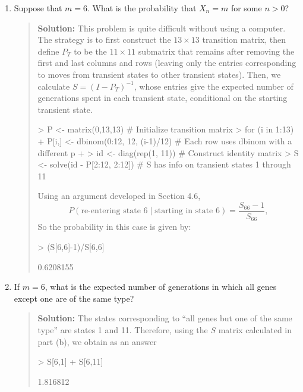 \documentclass{article}
\begin{document}
\begin{enumerate}
\begin{enumerate}
    \item Suppose that $m=6$. What is the probability that $X_n=m$ for some
    $n>0$?
    \begin{quotation}{\bf Solution:}
    This problem is quite difficult without using a computer.  The strategy is to first construct
    the $13\times 13$ transition matrix, then define $P_T$ to be the $11\times 11$ submatrix 
    that remains after removing the first and last columns and rows (leaving only the entries
    corresponding to moves from transient states to other transient states).  Then, we calculate
    $S=(I-P_T)^{-1}$, whose entries give the expected number of generations spent in each
    transient state, conditional on the starting transient state.
\begin{Schunk}
\begin{Sinput}
> P <- matrix(0,13,13) # Initialize transition matrix
> for (i in 1:13) {
+   P[i,] <- dbinom(0:12, 12, (i-1)/12) # Each row uses dbinom with a different p
+ }
> id <- diag(rep(1, 11)) # Construct identity matrix
> S <- solve(id - P[2:12, 2:12])    # S has info on transient states 1 through 11
\end{Sinput}
\end{Schunk}
    Using an argument developed in Section 4.6, 
    \[
    P(\mbox{re-entering state 6} \mid \mbox{starting in state 6}) = \frac{S_{66}-1}{S_{66}},
    \]
    So the probability in this case is given by:
\begin{Schunk}
\begin{Sinput}
> (S[6,6]-1)/S[6,6]
\end{Sinput}
\begin{Soutput}
[1] 0.6208155
\end{Soutput}
\end{Schunk}
    \end{quotation}

    \item If $m=6$, what is the expected number of generations in which all
    genes except one are of the same type?
    \begin{quotation}{\bf Solution:}
    The states corresponding to ``all genes but one of the same type'' are states 1 
    and 11.  Therefore, using the $S$ matrix calculated in part (b), we obtain 
    as an answer
\begin{Schunk}
\begin{Sinput}
> S[6,1] + S[6,11]
\end{Sinput}
\begin{Soutput}
[1] 1.816812
\end{Soutput}
\end{Schunk}
    \end{quotation}


\end{enumerate}
\end{enumerate}
\end{document}
